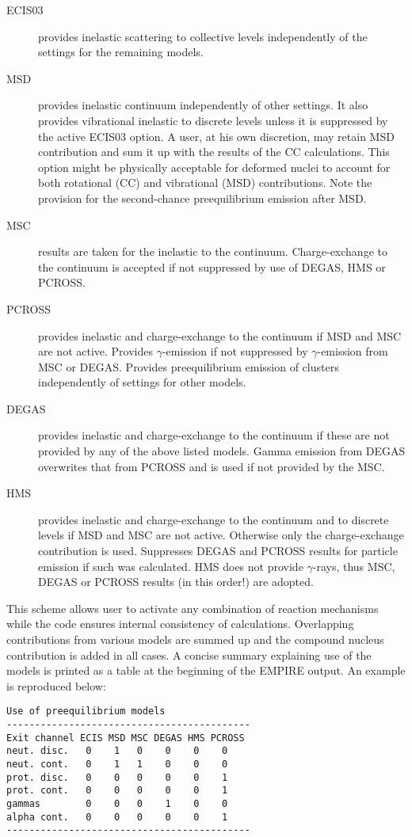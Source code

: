 \documentclass[twocolumn,amsmath,amssymb,10pt,groupedaddress,letter]{revtex4}
\begin{document}
\begin{description}
\item [ECIS03] provides inelastic scattering to collective
levels independently of the settings for the remaining models.
\item [MSD] provides inelastic continuum independently of other
settings. It also provides vibrational inelastic to discrete levels unless
it is suppressed by the active ECIS03 option.
A user, at his own discretion, may retain MSD contribution and sum it
up with the results of the CC calculations. This option might be physically
acceptable for deformed nuclei to account for both rotational (CC) and
vibrational (MSD) contributions. Note the provision for the second-chance preequilibrium
emission after MSD.
\item [MSC] results are taken for the inelastic to the continuum.
Charge-exchange to the continuum is accepted if not suppressed by
use of DEGAS, HMS or PCROSS.
\item [PCROSS] provides inelastic and charge-exchange to
the continuum if MSD and MSC are not active. Provides $\gamma$-emission if not suppressed by $\gamma$-emission
from MSC or DEGAS. Provides preequilibrium emission of clusters independently
of settings for other models.
\item [DEGAS] provides inelastic and charge-exchange to  the
continuum if these are not provided by any of the above listed
models. Gamma emission from DEGAS overwrites that from PCROSS and
is used if not provided by the MSC.
\item [HMS] provides inelastic and charge-exchange to the continuum
and to discrete levels if MSD and MSC are
not active. Otherwise only the charge-exchange contribution is used.
Suppresses DEGAS and PCROSS results for particle emission if such
was calculated. HMS does not provide $\gamma$-rays, thus
MSC, DEGAS or PCROSS results (in this order!) are adopted.
\end{description}
This scheme allows user to activate any combination of reaction
mechanisms while the code ensures internal consistency of calculations.
Overlapping contributions from various models are summed up and the
compound nucleus contribution is added in all cases. A concise summary
explaining use of the models is printed as a table at the beginning
of the EMPIRE output. An example is reproduced below:

\begin{verbatim}
Use of preequilibrium models
-------------------------------------------
Exit channel ECIS MSD MSC DEGAS HMS PCROSS
neut. disc.   0    1   0    0    0    0
neut. cont.   0    1   1    0    0    0
prot. disc.   0    0   0    0    0    1
prot. cont.   0    0   0    0    0    1
gammas        0    0   0    1    0    0
alpha cont.   0    0   0    0    0    1
-------------------------------------------
\end{verbatim}
\end{document}
